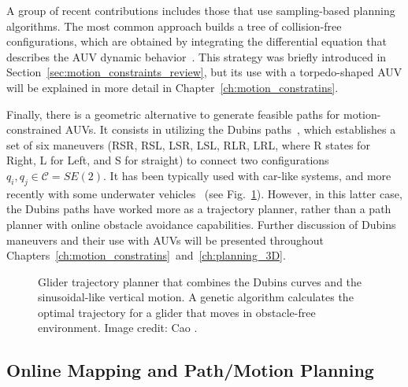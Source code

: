 A group of recent contributions includes those that use sampling-based planning
algorithms. The most common approach builds a tree of collision-free
configurations, which are obtained by integrating the differential equation that
describes the \ac{AUV} dynamic behavior~\cite{Tan2004,Caldwell2010,Heo2013}.
This strategy was briefly introduced in
Section~\ref{sec:motion_constraints_review}, but its use with a torpedo-shaped
\ac{AUV} will be explained in more detail in
Chapter~\ref{ch:motion_constratins}.

Finally, there is a geometric alternative to generate feasible paths for
motion-constrained \acp{AUV}. It consists in utilizing the Dubins
paths~\cite{Dubins1957}, which establishes a set of six maneuvers (RSR, RSL,
LSR, LSL, RLR, LRL, where R states for Right, L for Left, and S for straight) to
connect two configurations $q_i,q_j \in \mathcal{C} = SE(2)$. It has been
typically used with car-like systems, and more recently with some underwater
vehicles~\cite{Wehbe2014,Cao2016} (see Fig.~\ref{fig:Dubins3DGlidersConstrAUV}).
However, in this latter case, the Dubins paths have worked more as a trajectory
planner, rather than a path planner with online obstacle avoidance capabilities.
Further discussion of Dubins maneuvers and their use with \acp{AUV} will be
presented throughout
Chapters~\ref{ch:motion_constratins}~and~\ref{ch:planning_3D}.

\begin{figure}[htbp]
    \myfloatalign
     \quad
\caption[Glider trajectory planner combining the Dubins curves and
sinusoidal-like vertical motion.]
{\protect {} Glider trajectory planner that
combines the Dubins curves and the sinusoidal-like vertical motion.
\protect {} A genetic algorithm calculates
the optimal trajectory for a glider that moves in obstacle-free environment.
Image credit: Cao \etal\cite{Cao2016}.}
\label{fig:Dubins3DGlidersConstrAUV}
\end{figure}

\subsection{Online Mapping and Path/Motion Planning}

